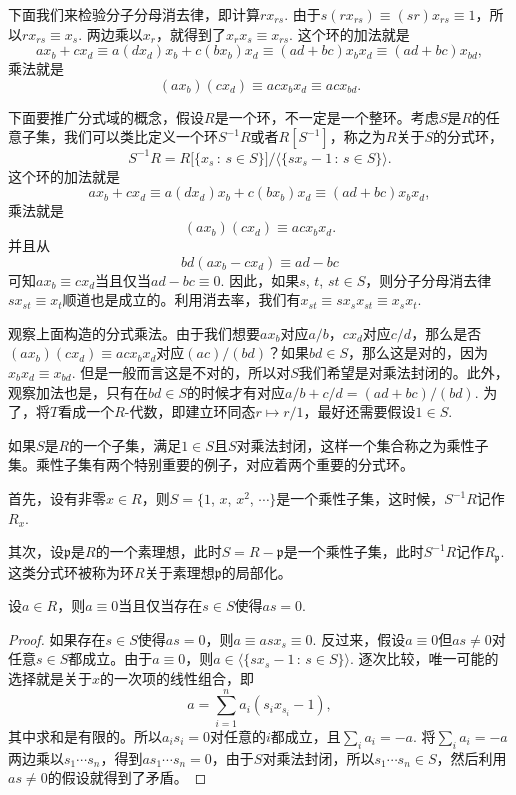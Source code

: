 下面我们来检验分子分母消去律，即计算$rx_{rs}$. 由于$s(rx_{rs})\equiv (sr)x_{rs}\equiv 1$，所以$rx_{rs}\equiv x_s$. 两边乘以$x_r$，就得到了$x_rx_s\equiv x_{rs}$. 这个环的加法就是
\[
	ax_{b}+cx_d\equiv a(dx_d)x_{b}+c(bx_{b})x_d\equiv (ad+bc)x_bx_d \equiv (ad+bc)x_{bd},
\]
乘法就是
\[
	(ax_{b})(cx_d)\equiv acx_bx_d\equiv acx_{bd}.
\]

\para 下面要推广分式域的概念，假设$R$是一个环，不一定是一个整环。考虑$S$是$R$的任意子集，我们可以类比定义一个环$S^{-1}R$或者$R[S^{-1}]$，称之为$R$关于$S$的分式环，
\[
	S^{-1}R=R\bigl[\{x_s\,:\, s\in S\}\bigr]\big/\bigl\langle\{sx_s-1\,:\, s\in S\}\bigr\rangle.
\]
这个环的加法就是
\[
	ax_{b}+cx_d\equiv a(dx_d)x_{b}+c(bx_{b})x_d\equiv (ad+bc)x_bx_d,
\]
乘法就是
\[
	(ax_{b})(cx_d)\equiv acx_bx_d.
\]
并且从
\[
	bd(ax_{b}-cx_d)\equiv ad-bc
\]
可知$ax_{b}\equiv cx_d$当且仅当$ad-bc\equiv 0$. 因此，如果$s$, $t$, $st\in S$，则分子分母消去律$sx_{st}\equiv x_t$顺道也是成立的。利用消去率，我们有$x_{st}\equiv sx_s x_{st}\equiv x_s x_t$.

观察上面构造的分式乘法。由于我们想要$ax_b$对应$a/b$，$cx_d$对应$c/d$，那么是否$(ax_{b})(cx_d)\equiv acx_bx_d$对应$(ac)/(bd)$？如果$bd\in S$，那么这是对的，因为$x_bx_d\equiv x_{bd}$. 但是一般而言这是不对的，所以对$S$我们希望是对乘法封闭的。此外，观察加法也是，只有在$bd\in S$的时候才有对应$a/b+c/d=(ad+bc)/(bd)$. 为了，将$T$看成一个$R$-代数，即建立环同态$r\mapsto r/1$，最好还需要假设$1\in S$.

如果$S$是$R$的一个子集，满足$1\in S$且$S$对乘法封闭，这样一个集合称之为乘性子集。乘性子集有两个特别重要的例子，对应着两个重要的分式环。

首先，设有非零$x\in R$，则$S=\{1$, $x$, $x^2$, $\cdots\}$是一个乘性子集，这时候，$S^{-1}R$记作$R_x$.

其次，设$\mathfrak{p}$是$R$的一个素理想，此时$S=R-\mathfrak{p}$是一个乘性子集，此时$S^{-1}R$记作$R_\mathfrak{p}$. 这类分式环被称为环$R$关于素理想$\mathfrak{p}$的局部化。

\begin{lem}
设$a\in R$，则$a\equiv 0$当且仅当存在$s \in S$使得$as=0$.
\end{lem}

\begin{proof} 
	如果存在$s \in S$使得$as=0$，则$a\equiv asx_s\equiv 0$. 反过来，假设$a\equiv 0$但$as\neq 0$对任意$s\in S$都成立。由于$a\equiv 0$，则$a\in \bigl\langle\{sx_s-1\,:\, s\in S\}\bigr\rangle$. 逐次比较，唯一可能的选择就是关于$x$的一次项的线性组合，即
	\[
	a=\sum_{i=1}^n a_i(s_ix_{s_i}-1),
	\]
	其中求和是有限的。所以$a_is_i=0$对任意的$i$都成立，且$\sum_i a_i=-a$. 将$\sum_i a_i=-a$两边乘以$s_1\cdots s_n$，得到$as_1\cdots s_n=0$，由于$S$对乘法封闭，所以$s_1\cdots s_n\in S$，然后利用$as\neq 0$的假设就得到了矛盾。
\end{proof}

